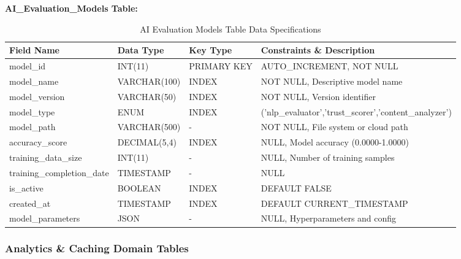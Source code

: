 \documentclass[12pt,a4paper,oneside]{book}
\begin{document}
\textbf{AI\_Evaluation\_Models Table:}
\begin{table}[H]
\centering
\caption{AI Evaluation Models Table Data Specifications}
\footnotesize
\begin{tabular}{|L{3cm}|L{2.5cm}|L{1.5cm}|L{5cm}|}
\hline
\textbf{Field Name} & \textbf{Data Type} & \textbf{Key Type} & \textbf{Constraints \& Description} \\
\hline
model\_id & INT(11) & PRIMARY KEY & AUTO\_INCREMENT, NOT NULL \\
\hline
model\_name & VARCHAR(100) & INDEX & NOT NULL, Descriptive model name \\
\hline
model\_version & VARCHAR(50) & INDEX & NOT NULL, Version identifier \\
\hline
model\_type & ENUM & INDEX & ('nlp\_evaluator','trust\_scorer','content\_analyzer') \\
\hline
model\_path & VARCHAR(500) & - & NOT NULL, File system or cloud path \\
\hline
accuracy\_score & DECIMAL(5,4) & INDEX & NULL, Model accuracy (0.0000-1.0000) \\
\hline
training\_data\_size & INT(11) & - & NULL, Number of training samples \\
\hline
training\_completion\_date & TIMESTAMP & - & NULL \\
\hline
is\_active & BOOLEAN & INDEX & DEFAULT FALSE \\
\hline
created\_at & TIMESTAMP & INDEX & DEFAULT CURRENT\_TIMESTAMP \\
\hline
model\_parameters & JSON & - & NULL, Hyperparameters and config \\
\hline
\end{tabular}
\end{table}

\subsubsection{Analytics \& Caching Domain Tables}
\end{document}
